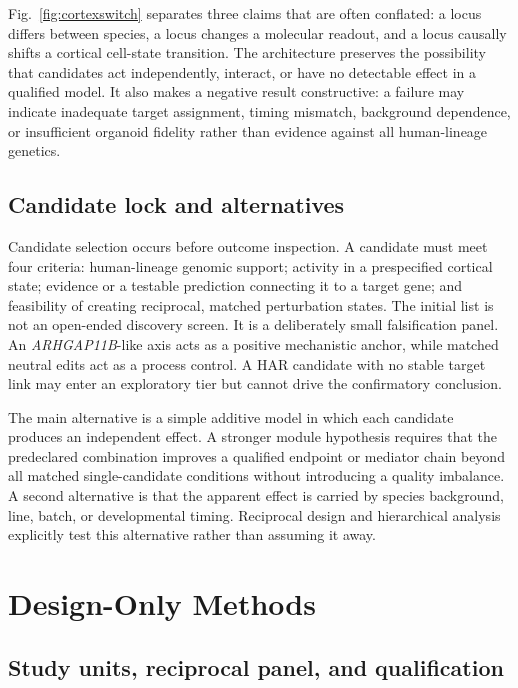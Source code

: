 \documentclass[conference]{IEEEtran}
\begin{document}
Fig.~\ref{fig:cortexswitch} separates three claims that are often conflated: a locus differs between species, a locus changes a molecular readout, and a locus causally shifts a cortical cell-state transition. The architecture preserves the possibility that candidates act independently, interact, or have no detectable effect in a qualified model. It also makes a negative result constructive: a failure may indicate inadequate target assignment, timing mismatch, background dependence, or insufficient organoid fidelity rather than evidence against all human-lineage genetics.

\subsection{Candidate lock and alternatives}

Candidate selection occurs before outcome inspection. A candidate must meet four criteria: human-lineage genomic support; activity in a prespecified cortical state; evidence or a testable prediction connecting it to a target gene; and feasibility of creating reciprocal, matched perturbation states. The initial list is not an open-ended discovery screen. It is a deliberately small falsification panel. An \emph{ARHGAP11B}-like axis acts as a positive mechanistic anchor, while matched neutral edits act as a process control. A HAR candidate with no stable target link may enter an exploratory tier but cannot drive the confirmatory conclusion.

The main alternative is a simple additive model in which each candidate produces an independent effect. A stronger module hypothesis requires that the predeclared combination improves a qualified endpoint or mediator chain beyond all matched single-candidate conditions without introducing a quality imbalance. A second alternative is that the apparent effect is carried by species background, line, batch, or developmental timing. Reciprocal design and hierarchical analysis explicitly test this alternative rather than assuming it away.

\section{Design-Only Methods}

\subsection{Study units, reciprocal panel, and qualification}
\end{document}
